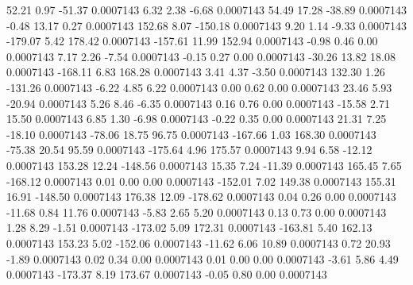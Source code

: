        52.21        0.97      -51.37     0.0007143
        6.32        2.38       -6.68     0.0007143
       54.49       17.28      -38.89     0.0007143
       -0.48       13.17        0.27     0.0007143
      152.68        8.07     -150.18     0.0007143
        9.20        1.14       -9.33     0.0007143
     -179.07        5.42      178.42     0.0007143
     -157.61       11.99      152.94     0.0007143
       -0.98        0.46        0.00     0.0007143
        7.17        2.26       -7.54     0.0007143
       -0.15        0.27        0.00     0.0007143
      -30.26       13.82       18.08     0.0007143
     -168.11        6.83      168.28     0.0007143
        3.41        4.37       -3.50     0.0007143
      132.30        1.26     -131.26     0.0007143
       -6.22        4.85        6.22     0.0007143
        0.00        0.62        0.00     0.0007143
       23.46        5.93      -20.94     0.0007143
        5.26        8.46       -6.35     0.0007143
        0.16        0.76        0.00     0.0007143
      -15.58        2.71       15.50     0.0007143
        6.85        1.30       -6.98     0.0007143
       -0.22        0.35        0.00     0.0007143
       21.31        7.25      -18.10     0.0007143
      -78.06       18.75       96.75     0.0007143
     -167.66        1.03      168.30     0.0007143
      -75.38       20.54       95.59     0.0007143
     -175.64        4.96      175.57     0.0007143
        9.94        6.58      -12.12     0.0007143
      153.28       12.24     -148.56     0.0007143
       15.35        7.24      -11.39     0.0007143
      165.45        7.65     -168.12     0.0007143
        0.01        0.00        0.00     0.0007143
     -152.01        7.02      149.38     0.0007143
      155.31       16.91     -148.50     0.0007143
      176.38       12.09     -178.62     0.0007143
        0.04        0.26        0.00     0.0007143
      -11.68        0.84       11.76     0.0007143
       -5.83        2.65        5.20     0.0007143
        0.13        0.73        0.00     0.0007143
        1.28        8.29       -1.51     0.0007143
     -173.02        5.09      172.31     0.0007143
     -163.81        5.40      162.13     0.0007143
      153.23        5.02     -152.06     0.0007143
      -11.62        6.06       10.89     0.0007143
        0.72       20.93       -1.89     0.0007143
        0.02        0.34        0.00     0.0007143
        0.01        0.00        0.00     0.0007143
       -3.61        5.86        4.49     0.0007143
     -173.37        8.19      173.67     0.0007143
       -0.05        0.80        0.00     0.0007143
